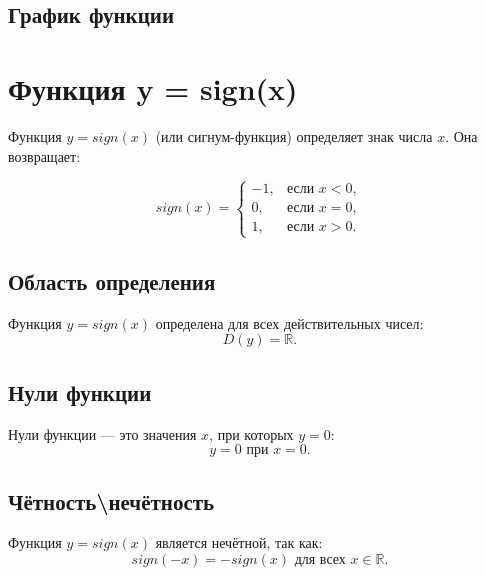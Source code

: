 \begin{flushleft}
		\subsection*{График функции}
		
		 \begin{center}
		 \end{center}
		 
		 
		\section{Функция y = sign(x)}
		Функция $y=sign(x)$ (или сигнум-функция) определяет знак числа $x$. Она возвращает:
		 
		\[
		sign(x)=
		\begin{cases}
			-1, & \text{если } x < 0,\\
			 0, & \text{если } x = 0,\\
			 1, & \text{если } x > 0.
		\end{cases}
		\]
		 
		\subsection*{Область определения}
		Функция $y=sign(x)$ определена для всех действительных чисел:
		\[D(y)=\mathds{R}.\]
		 
		\subsection*{Нули функции}
		Нули функции — это значения $x$, при которых $y=0$:
		\[y=0 \text{ при } x=0.\]
		 
		\subsection*{Чётность\textbackslash нечётность}
		Функция $y=sign(x)$ является нечётной, так как:
		\[sign(-x)=-sign(x) \text{ для всех }x\in\mathds{R}.\]
		 

\end{flushleft}
